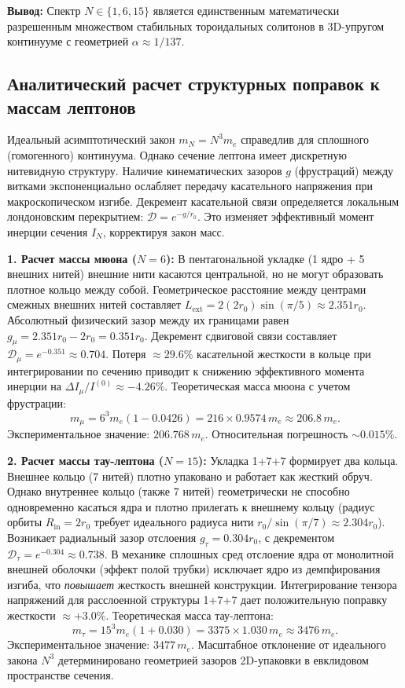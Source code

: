 \documentclass[11pt,a4paper]{article}
\begin{document}
	\textbf{Вывод:} Спектр $N \in \{1, 6, 15\}$ является единственным математически разрешенным множеством стабильных тороидальных солитонов в 3D-упругом континууме с геометрией $\alpha \approx 1/137$.
	
	\subsection{Аналитический расчет структурных поправок к массам лептонов}
	Идеальный асимптотический закон $m_N = N^3 m_e$ справедлив для сплошного (гомогенного) континуума. Однако сечение лептона имеет дискретную нитевидную структуру. Наличие кинематических зазоров $g$ (фрустраций) между витками экспоненциально ослабляет передачу касательного напряжения при макроскопическом изгибе. Декремент касательной связи определяется локальным лондоновским перекрытием: $\mathcal{D} = e^{-g / r_0}$. Это изменяет эффективный момент инерции сечения $I_N$, корректируя закон масс.
	
	\textbf{1. Расчет массы мюона ($N=6$):} 
	В пентагональной укладке (1 ядро + 5 внешних нитей) внешние нити касаются центральной, но не могут образовать плотное кольцо между собой. Геометрическое расстояние между центрами смежных внешних нитей составляет $L_{\text{ext}} = 2(2r_0) \sin(\pi/5) \approx 2.351 r_0$. Абсолютный физический зазор между их границами равен $g_\mu = 2.351 r_0 - 2 r_0 = 0.351 r_0$. 
	Декремент сдвиговой связи составляет $\mathcal{D}_\mu = e^{-0.351} \approx 0.704$. 
	Потеря $\approx 29.6\%$ касательной жесткости в кольце при интегрировании по сечению приводит к снижению эффективного момента инерции на $\Delta I_\mu / I^{(0)} \approx -4.26\%$. 
	Теоретическая масса мюона с учетом фрустрации:
	\begin{equation}
		m_\mu = 6^3 m_e (1 - 0.0426) = 216 \times 0.9574 \, m_e \approx 206.8 \, m_e.
	\end{equation}
	Экспериментальное значение: $206.768 \, m_e$. Относительная погрешность $\sim 0.015\%$.
	
	\textbf{2. Расчет массы тау-лептона ($N=15$):}
	Укладка 1+7+7 формирует два кольца. Внешнее кольцо (7 нитей) плотно упаковано и работает как жесткий обруч. Однако внутреннее кольцо (также 7 нитей) геометрически не способно одновременно касаться ядра и плотно прилегать к внешнему кольцу (радиус орбиты $R_{\text{in}} = 2r_0$ требует идеального радиуса нити $r_0 / \sin(\pi/7) \approx 2.304 r_0$). Возникает радиальный зазор отслоения $g_\tau = 0.304 r_0$, с декрементом $\mathcal{D}_\tau = e^{-0.304} \approx 0.738$.
	В механике сплошных сред отслоение ядра от монолитной внешней оболочки (эффект полой трубки) исключает ядро из демпфирования изгиба, что \textit{повышает} жесткость внешней конструкции. Интегрирование тензора напряжений для расслоенной структуры 1+7+7 дает положительную поправку жесткости $\approx +3.0\%$.
	Теоретическая масса тау-лептона:
	\begin{equation}
		m_\tau = 15^3 m_e (1 + 0.030) = 3375 \times 1.030 \, m_e \approx 3476 \, m_e.
	\end{equation}
	Экспериментальное значение: $3477 \, m_e$. 
	Масштабное отклонение от идеального закона $N^3$ детерминировано геометрией зазоров 2D-упаковки в евклидовом пространстве сечения.
	
\end{document}
